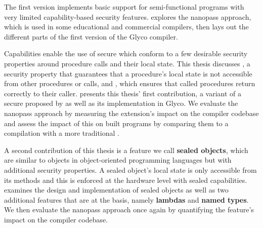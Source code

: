 \documentclass[main.tex]{subfiles}
\begin{document}
The first version implements basic support for semi-functional programs with very limited capability-based security features.  explores the nanopass approach, which is used in some educational and commercial compilers, then lays out the different parts of the first version of the Glyco compiler.

Capabilities enable the use of secure  which conform to a few desirable security properties around procedure calls and their local state. This thesis discusses , a security property that guarantees that a procedure's local state is not accessible from other procedures or calls, and , which ensures that called procedures return correctly to their caller.  presents this thesis' first contribution, a variant of a secure  proposed by \cite{cerise} as well as its implementation in Glyco. We evaluate the nanopass approach by measuring the extension's impact on the compiler codebase and assess the impact of this  on built programs by comparing them to a compilation with a more traditional .

A second contribution of this thesis is a feature we call \textbf{sealed objects}, which are similar to objects in object-oriented programming languages but with additional security properties. A sealed object's local state is only accessible from its methods and this is enforced at the hardware level with sealed capabilities.  examines the design and implementation of sealed objects as well as two additional features that are at the basis, namely \textbf{lambdas} and \textbf{named types}. We then evaluate the nanopass approach once again by quantifying the feature's impact on the compiler codebase.

\biblio{}
\onlyinsubfile{\glsaddall\printglossaries}
\end{document}
